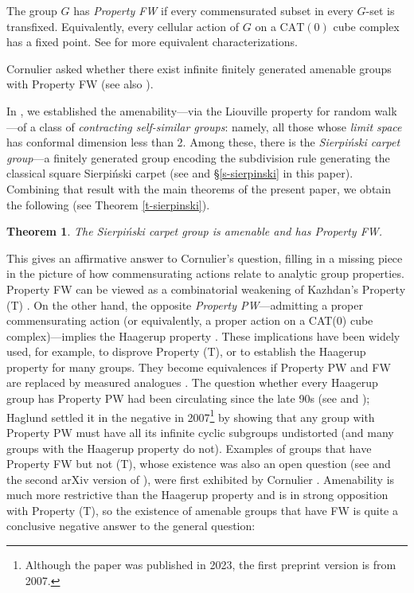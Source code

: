 \documentclass[11pt]{amsart}
\theoremstyle{definition}
\theoremstyle{plain}
\newtheorem*{thm*}{Theorem}
\newtheorem{main thm}{Theorem}
\theoremstyle{remark}
\theoremstyle{plain}
\begin{document}
The group $G$ has \emph{Property FW} if every commensurated subset in every $G$-set is transfixed. Equivalently, every cellular action of $G$ on a $\mathrm{CAT}(0)$ cube complex has a fixed point. See \cite{Cor-FWsurvey} for more equivalent characterizations.




Cornulier asked whether there exist infinite finitely generated amenable groups with Property FW  \cite[Question 1.19(2)]{Cor-FM} (see also \cite[Question 1.11]{Cor-Piecewise}). 

In \cite{MNZ}, we established the amenability---via the Liouville property for random walk---of a class of \emph{contracting self-similar groups}: namely, all those whose \emph{limit space} has conformal dimension less than 2.  Among these, there is the \emph{Sierpi\'nski carpet group}---a finitely generated group encoding the subdivision rule generating the classical square Sierpi\'nski carpet (see \cite[\S6.3]{MNZ} and \S\ref{s-sierpinski} in this paper). Combining that result with the main theorems of the present paper, we obtain the following (see Theorem \ref{t-sierpinski}).

\begin{thm*}
The Sierpi\'nski carpet group is amenable and has Property FW.
\end{thm*}
This gives an affirmative answer to Cornulier’s question, filling in a missing piece in the picture of how commensurating actions relate to analytic group properties. Property FW can be viewed as a combinatorial weakening of Kazhdan's Property (T) \cite{NR, CV}. On the other hand, the opposite \emph{Property PW}---admitting a proper commensurating action (or equivalently, a proper action on a CAT(0) cube complex)---implies the Haagerup property \cite[Cor. 7.4.2]{CCJJA}. These implications have been widely used, for example, to disprove Property (T), or to establish the Haagerup property for many groups. They become equivalences if Property PW and FW are replaced by measured analogues \cite{RobertsonSteger, CDH}. The question whether every Haagerup group has Property PW had been circulating since the late 90s (see \cite{CN, CV} and \cite[\S2.C]{Cor-FWsurvey}); Haglund settled it in the negative in 2007\footnote{Although the paper \cite{Haglund} was published in 2023, the first preprint version is from 2007.} by showing that any group with Property PW must have all its infinite cyclic subgroups undistorted \cite{Haglund} (and many groups with the Haagerup property do not). Examples of groups that have Property FW but not (T), whose existence was also an open question (see \cite{Bar-Cha} and the second arXiv version of \cite{CDH}), were first exhibited by Cornulier \cite{Cor-FM}. Amenability is much more restrictive than the Haagerup property and is in strong opposition with Property (T), so the existence of amenable groups that have FW is quite a conclusive negative answer to the general question:
\end{document}
